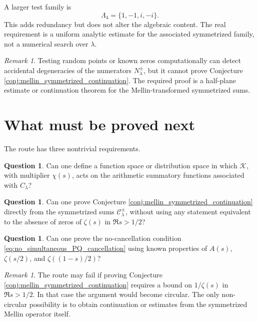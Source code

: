 \documentclass[11pt]{amsart}
\numberwithin{equation}{section}
\theoremstyle{plain}
\theoremstyle{definition}
\newtheorem{question}[theorem]{Question}
\theoremstyle{remark}
\newtheorem{remark}[theorem]{Remark}
\begin{document}
A larger test family is
\begin{equation}
\Lambda_4=\{1,-1,i,-i\}.
\label{eq:lambda_family_four}
\end{equation}
This adds redundancy but does not alter the algebraic content.  The real requirement is a uniform analytic estimate for the associated symmetrized family, not a numerical search over \(\lambda\).

\begin{remark}
\label{rem:random_zeros_computation}
Testing random points or known zeros computationally can detect accidental degeneracies of the numerators \(N_\lambda^\pm\), but it cannot prove Conjecture \ref{conj:mellin_symmetrized_continuation}.  The required proof is a half-plane estimate or continuation theorem for the Mellin-transformed symmetrized sums.
\end{remark}

\section{What must be proved next}
\label{sec:what_must_be_proved_next}

The route has three nontrivial requirements.

\begin{question}
\label{ques:function_space_for_K}
Can one define a function space or distribution space in which \(\mathcal K\), with multiplier \(\chi(s)\), acts on the arithmetic summatory functions associated with \(C_\lambda\)?
\end{question}

\begin{question}
\label{ques:mellin_continuation_without_RH}
Can one prove Conjecture \ref{conj:mellin_symmetrized_continuation} directly from the symmetrized sums \(\mathcal C_\lambda^{\pm}\), without using any statement equivalent to the absence of zeros of \(\zeta(s)\) in \(\Re s>1/2\)?
\end{question}

\begin{question}
\label{ques:numerator_no_cancellation}
Can one prove the no-cancellation condition \eqref{eq:no_simultaneous_PQ_cancellation} using known properties of \(A(s)\), \(\zeta(s/2)\), and \(\zeta((1-s)/2)\)?
\end{question}

\begin{remark}
\label{rem:where_route_may_fail}
The route may fail if proving Conjecture \ref{conj:mellin_symmetrized_continuation} requires a bound on \(1/\zeta(s)\) in \(\Re s>1/2\).  In that case the argument would become circular.  The only non-circular possibility is to obtain continuation or estimates from the symmetrized Mellin operator itself.
\end{remark}
\end{document}
